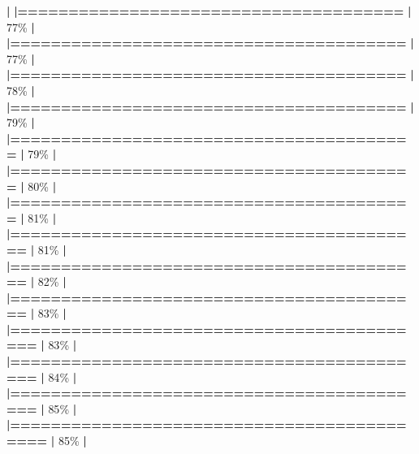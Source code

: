 \documentclass[
]{book}
\newenvironment{Shaded}{\begin{snugshade}}{\end{snugshade}}
\newcommand{\DecValTok}[1]{\textcolor[rgb]{0.00,0.00,0.81}{#1}}
\newcommand{\ErrorTok}[1]{\textcolor[rgb]{0.64,0.00,0.00}{\textbf{#1}}}
\newcommand{\NormalTok}[1]{#1}
\newcommand{\SpecialCharTok}[1]{\textcolor[rgb]{0.81,0.36,0.00}{\textbf{#1}}}
\begin{document}
\begin{Shaded}
\begin{Highlighting}[]
  \SpecialCharTok{|}                                                        
  \ErrorTok{|======================================}            \ErrorTok{|}  \DecValTok{77}\NormalTok{\%}
  \SpecialCharTok{|}                                                        
  \ErrorTok{|=======================================}           \ErrorTok{|}  \DecValTok{77}\NormalTok{\%}
  \SpecialCharTok{|}                                                        
  \ErrorTok{|=======================================}           \ErrorTok{|}  \DecValTok{78}\NormalTok{\%}
  \SpecialCharTok{|}                                                        
  \ErrorTok{|=======================================}           \ErrorTok{|}  \DecValTok{79}\NormalTok{\%}
  \SpecialCharTok{|}                                                        
  \ErrorTok{|========================================}          \ErrorTok{|}  \DecValTok{79}\NormalTok{\%}
  \SpecialCharTok{|}                                                        
  \ErrorTok{|========================================}          \ErrorTok{|}  \DecValTok{80}\NormalTok{\%}
  \SpecialCharTok{|}                                                        
  \ErrorTok{|========================================}          \ErrorTok{|}  \DecValTok{81}\NormalTok{\%}
  \SpecialCharTok{|}                                                        
  \ErrorTok{|=========================================}         \ErrorTok{|}  \DecValTok{81}\NormalTok{\%}
  \SpecialCharTok{|}                                                        
  \ErrorTok{|=========================================}         \ErrorTok{|}  \DecValTok{82}\NormalTok{\%}
  \SpecialCharTok{|}                                                        
  \ErrorTok{|=========================================}         \ErrorTok{|}  \DecValTok{83}\NormalTok{\%}
  \SpecialCharTok{|}                                                        
  \ErrorTok{|==========================================}        \ErrorTok{|}  \DecValTok{83}\NormalTok{\%}
  \SpecialCharTok{|}                                                        
  \ErrorTok{|==========================================}        \ErrorTok{|}  \DecValTok{84}\NormalTok{\%}
  \SpecialCharTok{|}                                                        
  \ErrorTok{|==========================================}        \ErrorTok{|}  \DecValTok{85}\NormalTok{\%}
  \SpecialCharTok{|}                                                        
  \ErrorTok{|===========================================}       \ErrorTok{|}  \DecValTok{85}\NormalTok{\%}
  \SpecialCharTok{|}                                                        

\end{Highlighting}
\end{Shaded}
\end{document}
